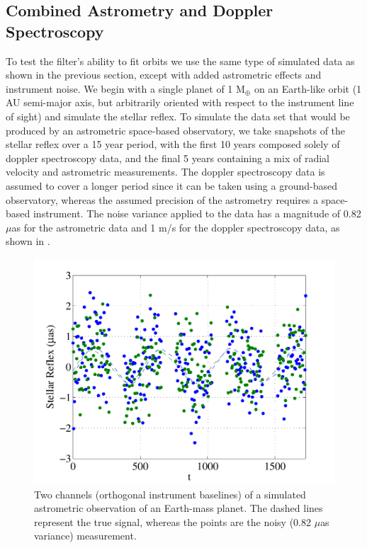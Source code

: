\subsection{Combined Astrometry and Doppler Spectroscopy}
To test the filter's ability to fit orbits we use the same type of simulated data as shown in the previous section, except with added astrometric effects and instrument noise. We begin with a single planet of 1 M$_\oplus$ on an Earth-like orbit (1 AU semi-major axis, but arbitrarily oriented with respect to the instrument line of sight) and simulate the stellar reflex.  To simulate the data set that would be produced by an astrometric space-based observatory, we take snapshots of the stellar reflex over a 15 year period, with the first 10 years composed solely of doppler spectroscopy data, and the final 5 years containing a mix of radial velocity and astrometric measurements.  The doppler spectroscopy data is assumed to cover a longer period since it can be taken using a ground-based observatory, whereas the assumed precision of the astrometry requires a space-based instrument.  The noise variance applied to the data has a magnitude of 0.82 $\mu$as for the astrometric data and 1 m/s for the doppler spectroscopy data, as shown in .
\begin{figure}[ht]
\centering
\includegraphics[width=5in]{./figures/astrom_dat}
 \caption[Astrometric observation noise]{Two channels (orthogonal instrument baselines) of a simulated astrometric observation of an Earth-mass planet.  The dashed lines represent the true signal, whereas the points are the noisy (0.82 $\mu$as variance) measurement. \label{fig:astrom_dat}}
\end{figure} 

